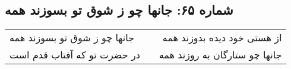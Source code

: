 \begin{center}
\section*{شماره ۶۵: جانها چو ز شوق تو بسوزند همه}
\label{sec:065}
\begin{longtable}{l p{0.5cm} r}
جانها چو ز شوق تو بسوزند همه
&&
از هستی خود دیده بدوزند همه
\\
در حضرت تو که آفتاب قدم است
&&
جانها چو ستارگان به روزند همه
\\
\end{longtable}
\end{center}
